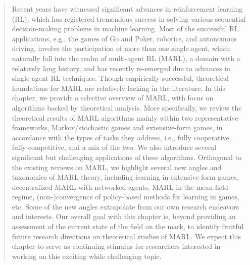\documentclass[12pt]{article}
\newcommand{\issue}[1]{{\color{red}#1}}
\begin{document}
\begin{abstract}
Recent years have witnessed significant advances in reinforcement learning (RL), which has registered tremendous success in solving various sequential decision-making problems in machine learning. Most of the successful RL applications, e.g., the games of Go and Poker, robotics, and autonomous driving, involve the participation of more than one single agent, which naturally  fall into the realm of multi-agent RL (MARL), a domain with a relatively long history, and   has recently re-emerged due to advances in single-agent RL techniques. Though empirically successful, theoretical foundations for MARL are relatively lacking in the literature. In this chapter, we provide a selective overview of MARL, with focus on  algorithms backed by theoretical analysis. More specifically, we review the theoretical results of MARL algorithms mainly within two representative frameworks, Markov/stochastic games and extensive-form games, in accordance with the types of tasks they address, i.e., fully cooperative, fully competitive, and a  mix of the two. We also introduce  several significant but challenging applications of these  algorithms. Orthogonal to the existing reviews on MARL,  we highlight several new angles and taxonomies of MARL theory, including learning in extensive-form games, decentralized MARL with networked agents, MARL in the mean-field regime, (non-)convergence of policy-based methods for learning in games, etc. Some of the new angles extrapolate from our own research endeavors and interests. 
 Our overall goal with this chapter is, beyond  providing an assessment of the current state of the field on the mark, to identify fruitful future research directions on   theoretical studies of MARL.  We   expect this chapter to serve as continuing stimulus for researchers interested in  working on this exciting while challenging topic.  
\end{abstract} 
\end{document}
